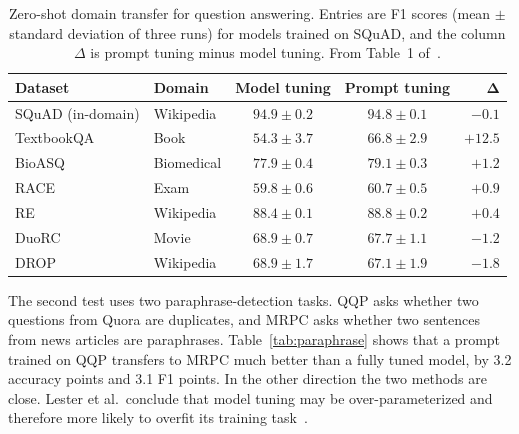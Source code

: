 \documentclass[12pt]{article}
\begin{document}
\begin{table}[htbp]
  \centering
  \caption{Zero-shot domain transfer for question answering. Entries are F1 scores (mean
    $\pm$ standard deviation of three runs) for models trained on SQuAD, and the column
    $\Delta$ is prompt tuning minus model tuning. From Table~1 of~\cite{lester2021}.}
  \label{tab:mrqa}
  \small
  \begin{tabular}{@{}l l c c r@{}}
    \toprule
    \textbf{Dataset} & \textbf{Domain} & \textbf{Model tuning} & \textbf{Prompt tuning} & $\boldsymbol{\Delta}$\\
    \midrule
    SQuAD (in-domain) & Wikipedia   & $94.9\pm0.2$ & $94.8\pm0.1$ & $-0.1$\\
    \midrule
    TextbookQA        & Book        & $54.3\pm3.7$ & $\mathbf{66.8}\pm2.9$ & \textcolor{ptgreen}{$+12.5$}\\
    BioASQ            & Biomedical  & $77.9\pm0.4$ & $\mathbf{79.1}\pm0.3$ & \textcolor{ptgreen}{$+1.2$}\\
    RACE              & Exam        & $59.8\pm0.6$ & $\mathbf{60.7}\pm0.5$ & \textcolor{ptgreen}{$+0.9$}\\
    RE                & Wikipedia   & $88.4\pm0.1$ & $\mathbf{88.8}\pm0.2$ & \textcolor{ptgreen}{$+0.4$}\\
    DuoRC             & Movie       & $\mathbf{68.9}\pm0.7$ & $67.7\pm1.1$ & \textcolor{ptred}{$-1.2$}\\
    DROP              & Wikipedia   & $\mathbf{68.9}\pm1.7$ & $67.1\pm1.9$ & \textcolor{ptred}{$-1.8$}\\
    \bottomrule
  \end{tabular}
\end{table}

The second test uses two paraphrase-detection tasks. QQP asks whether two questions from Quora
are duplicates, and MRPC asks whether two sentences from news articles are paraphrases.
Table~\ref{tab:paraphrase} shows that a prompt trained on QQP transfers to MRPC much better
than a fully tuned model, by 3.2 accuracy points and 3.1 F1 points. In the other direction the
two methods are close. Lester et al.\ conclude that model tuning may be over-parameterized and
therefore more likely to overfit its training task~\cite{lester2021}.
\end{document}

